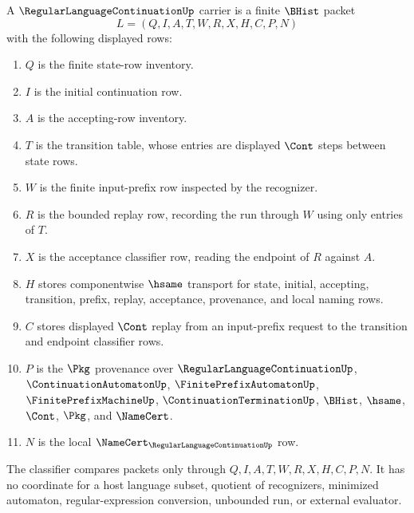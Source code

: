 \begin{definition}
\label{def:regular-language-continuation-carrier}
A $\RegularLanguageContinuationUp$ carrier is a finite $\BHist$ packet
$$
L=(Q,I,A,T,W,R,X,H,C,P,N)
$$
with the following displayed rows:
\begin{enumerate}
\item $Q$ is the finite state-row inventory.
\item $I$ is the initial continuation row.
\item $A$ is the accepting-row inventory.
\item $T$ is the transition table, whose entries are displayed $\Cont$ steps between state rows.
\item $W$ is the finite input-prefix row inspected by the recognizer.
\item $R$ is the bounded replay row, recording the run through $W$ using only entries of $T$.
\item $X$ is the acceptance classifier row, reading the endpoint of $R$ against $A$.
\item $H$ stores componentwise $\hsame$ transport for state, initial, accepting, transition, prefix, replay, acceptance, provenance, and local naming rows.
\item $C$ stores displayed $\Cont$ replay from an input-prefix request to the transition and endpoint classifier rows.
\item $P$ is the $\Pkg$ provenance over $\RegularLanguageContinuationUp$, $\ContinuationAutomatonUp$, $\FinitePrefixAutomatonUp$, $\FinitePrefixMachineUp$, $\ContinuationTerminationUp$, $\BHist$, $\hsame$, $\Cont$, $\Pkg$, and $\NameCert$.
\item $N$ is the local $\NameCert_{\RegularLanguageContinuationUp}$ row.
\end{enumerate}
The classifier compares packets only through $Q,I,A,T,W,R,X,H,C,P,N$. It has no coordinate for a host language subset, quotient of recognizers, minimized automaton, regular-expression conversion, unbounded run, or external evaluator.
\end{definition}

